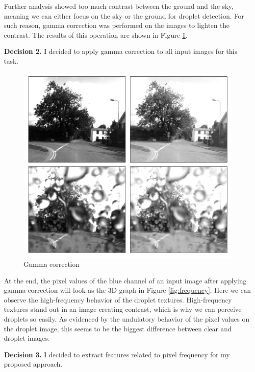 \documentclass[conference]{IEEEtran}
\begin{document}
Further analysis showed too much contrast between the ground and the sky, meaning we can either focus on the sky or the ground for droplet detection. For such reason, gamma correction was performed on the images to lighten the contrast. The results of this operation are shown in Figure \ref{fig:gamma}.

\textbf{Decision 2.} I decided to apply gamma correction to all input images for this task.

\begin{figure}[h!]
\centering
\includegraphics[width=0.87\linewidth]{images/gamma.png}
\caption{Gamma correction}
\label{fig:gamma}
\end{figure}

At the end, the pixel values of the blue channel of an input image after applying gamma correction will look as the 3D graph in Figure \ref{fig:frequency}. Here we can observe the high-frequency behavior of the droplet textures. High-frequency textures stand out in an image creating contrast, which is why we can perceive droplets so easily. As evidenced by the undulatory behavior of the pixel values on the droplet image, this seems to be the biggest difference between clear and droplet images.

\textbf{Decision 3.} I decided to extract features related to pixel frequency for my proposed approach.
\end{document}

